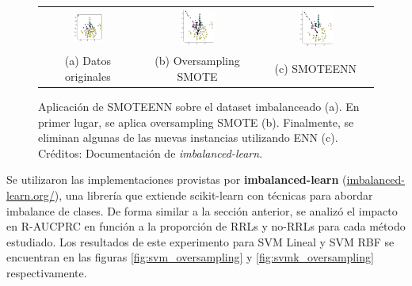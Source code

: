 \begin{figure}[h!]
\begin{tabular}{ccc}
  \includegraphics[width=0.32\textwidth]{Kap7/smoteenn_1.png} & \includegraphics[width=0.32\textwidth]{Kap7/smoteenn_2.png} & 
\includegraphics[width=0.32\textwidth]{Kap7/smoteenn_3.png} \\
(a) Datos originales & (b) Oversampling SMOTE & (c) SMOTEENN
\end{tabular}
\caption{ Aplicación de SMOTEENN sobre el dataset imbalanceado (a). En primer lugar, se aplica oversampling SMOTE (b). Finalmente, se eliminan algunas de las nuevas instancias utilizando ENN (c). Créditos: Documentación de \textit{imbalanced-learn}. }
\label{fig:smoteenn}
\end{figure}


Se utilizaron las implementaciones provistas por \textbf{imbalanced-learn} (\url{imbalanced-learn.org/}), una librería que extiende scikit-learn con técnicas para abordar imbalance de clases. De forma similar a la sección anterior, se analizó el impacto en R-AUCPRC en función a la proporción de RRLs y no-RRLs para cada método estudiado. Los resultados de este experimento para SVM Lineal y SVM RBF se encuentran en las figuras \ref{fig:svm_oversampling} y \ref{fig:svmk_oversampling} respectivamente.\\

